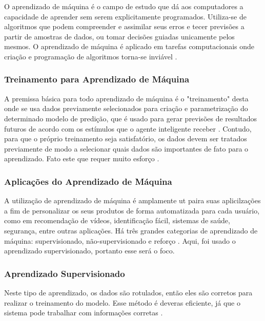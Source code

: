 O aprendizado de máquina é o campo de estudo que dá aos computadores a capacidade de aprender sem serem explicitamente programados. Utiliza-se de algoritmos que podem compreender e assimilar seus erros e tecer previsões a partir de amostras de dados, ou tomar decisões guiadas unicamente pelos mesmos. O aprendizado de máquina é aplicado em tarefas computacionais onde criação e programação de algoritmos torna-se inviável \cite{russell2002artificial}.

\subsubsection{Treinamento para Aprendizado de Máquina}

A premissa básica para todo aprendizado de máquina é o "treinamento" desta onde se usa dados previamente selecionados para criação e parametrização do determinado modelo de predição, que é usado para gerar previsões de resultados futuros de acordo com os estímulos que o agente inteligente receber \cite{russell2002artificial}. Contudo, para que o próprio treinamento seja satisfatório, os dados devem ser tratados previamente de modo a selecionar quais dados são importantes de fato para o aprendizado. Fato este que requer muito esforço \cite{russell2002artificial}.

\subsubsection{Aplicações do Aprendizado de Máquina}

A utilização de aprendizado de máquina é amplamente ut paira suas aplicilzações a fim de personalizar os seus produtos de forma automatizada para cada usuário, como em recomendação de vídeos, identificação fácil, sistemas de saúde, segurança, entre outras aplicações. Há três grandes categorias de aprendizado de máquina: supervisionado, não-supervisionado e reforço \cite{russell2002artificial}. Aqui, foi usado o aprendizado supervisionado, portanto esse será o foco.

\subsubsection{Aprendizado Supervisionado}

Neste tipo de aprendizado, os dados são rotulados, então eles são corretos para realizar o treinamento do modelo. Esse método é deveras eficiente, já que o sistema pode trabalhar com informações corretas \cite{russell2002artificial}. 

